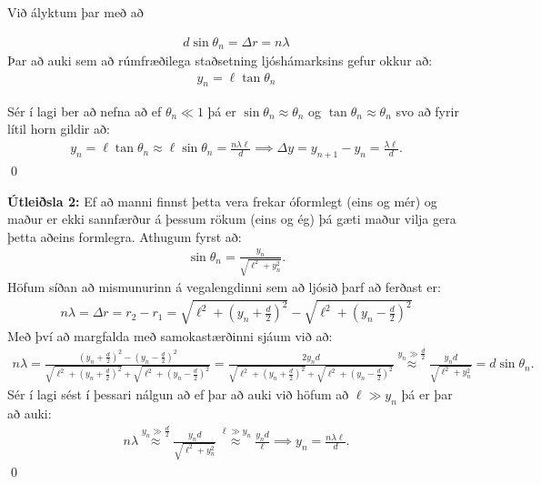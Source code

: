 \ifdefined \wholebook \else\documentclass[oneside]{book}\usepackage{EdlBook}\graphicspath{{figures/}}
\begin{document}
Við ályktum þar með að 

\begin{align*}
    d\sin\theta_n = \Delta r = n \lambda
\end{align*}
Þar að auki sem að rúmfræðilega staðsetning ljóshámarksins gefur okkur að:
\begin{align*}
    y_n = \ell \tan\theta_n
\end{align*}

Sér í lagi ber að nefna að ef $\theta_n \ll 1$ þá er $\sin\theta_n \approx \theta_n$ og $\tan\theta_n \approx \theta_n$ svo að fyrir lítil horn gildir að:
\begin{align*}
    y_n = \ell \tan\theta_n \approx \ell \sin\theta_n = \frac{n\lambda \ell}{d} \implies \Delta y = y_{n+1} - y_n = \frac{\lambda \ell}{d}.
\end{align*}
\qed



\textbf{Útleiðsla 2:} Ef að manni finnst þetta vera frekar óformlegt (eins og mér) og maður er ekki sannfærður á þessum rökum (eins og ég) þá gæti maður vilja gera þetta aðeins formlegra. Athugum fyrst að:
\begin{align*}
    \sin\theta_n = \frac{y_n}{\sqrt{\ell^2 + y_n^2}}.
\end{align*}
Höfum síðan að mismunurinn á vegalengdinni sem að ljósið þarf að ferðast er:
\begin{align*}
   n\lambda = \Delta r = r_2 - r_1 = \sqrt{\ell^2 + \left(y_n+\frac{d}{2}\right)^2} - \sqrt{\ell^2 + \left(y_n-\frac{d}{2}\right)^2}
\end{align*}
Með því að margfalda með samokastærðinni sjáum við að:
\begin{align*}
    n\lambda = \frac{\left(y_n + \frac{d}{2} \right)^2 - \left( y_n - \frac{d}{2} \right)^2}{\sqrt{\ell^2 + \left(y_n+\frac{d}{2}\right)^2} + \sqrt{\ell^2 + \left(y_n-\frac{d}{2}\right)^2}} = \frac{2y_n d}{\sqrt{\ell^2 + \left(y_n+\frac{d}{2}\right)^2} + \sqrt{\ell^2 + \left(y_n-\frac{d}{2}\right)^2}} \stackrel{y_n \gg \frac{d}{2}}{\approx} \frac{y_n d}{\sqrt{\ell^2 + y_n^2}} = d\sin\theta_n.
\end{align*}
Sér í lagi sést í þessari nálgun að ef þar að auki við höfum að $\ell \gg y_n$ þá er þar að auki:
\begin{align*}
    n \lambda \stackrel{y_n \gg \frac{d}{2}}{\approx} \frac{y_n d}{\sqrt{\ell^2 + y_n^2}} \stackrel{\ell \gg y_n}{\approx} \frac{y_n d}{\ell} \implies y_n = \frac{n\lambda \ell}{d}.
\end{align*}
\qed
\end{document}
